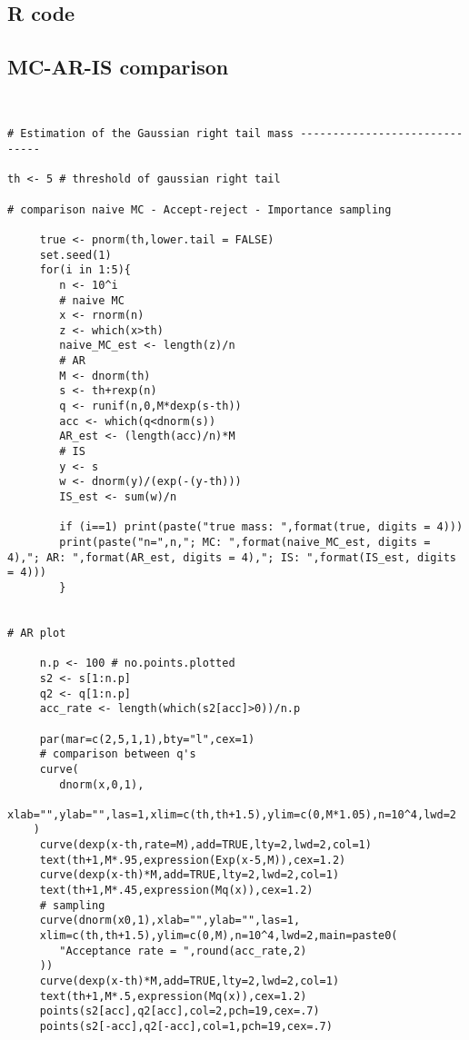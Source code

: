 \begin{appendices}
\chapter{R code}
\section{MC-AR-IS comparison}
\begin{verbatim}
    

# Estimation of the Gaussian right tail mass ------------------------------

th <- 5 # threshold of gaussian right tail

# comparison naive MC - Accept-reject - Importance sampling
     
     true <- pnorm(th,lower.tail = FALSE)
     set.seed(1)
     for(i in 1:5){
     	n <- 10^i
     	# naive MC
     	x <- rnorm(n)
     	z <- which(x>th)
     	naive_MC_est <- length(z)/n
     	# AR
     	M <- dnorm(th)
     	s <- th+rexp(n)
     	q <- runif(n,0,M*dexp(s-th))
     	acc <- which(q<dnorm(s))
     	AR_est <- (length(acc)/n)*M
     	# IS
     	y <- s
     	w <- dnorm(y)/(exp(-(y-th)))
     	IS_est <- sum(w)/n
     	
     	if (i==1) print(paste("true mass: ",format(true, digits = 4)))
     	print(paste("n=",n,"; MC: ",format(naive_MC_est, digits = 4),"; AR: ",format(AR_est, digits = 4),"; IS: ",format(IS_est, digits = 4)))
     	}


# AR plot

     n.p <- 100 # no.points.plotted
     s2 <- s[1:n.p]
     q2 <- q[1:n.p]
     acc_rate <- length(which(s2[acc]>0))/n.p
     
     par(mar=c(2,5,1,1),bty="l",cex=1)
     # comparison between q's
     curve(
        dnorm(x,0,1),
        xlab="",ylab="",las=1,xlim=c(th,th+1.5),ylim=c(0,M*1.05),n=10^4,lwd=2
    )
     curve(dexp(x-th,rate=M),add=TRUE,lty=2,lwd=2,col=1)
     text(th+1,M*.95,expression(Exp(x-5,M)),cex=1.2) 
     curve(dexp(x-th)*M,add=TRUE,lty=2,lwd=2,col=1)
     text(th+1,M*.45,expression(Mq(x)),cex=1.2) 
     # sampling
     curve(dnorm(x0,1),xlab="",ylab="",las=1,
     xlim=c(th,th+1.5),ylim=c(0,M),n=10^4,lwd=2,main=paste0(
        "Acceptance rate = ",round(acc_rate,2)
     ))
     curve(dexp(x-th)*M,add=TRUE,lty=2,lwd=2,col=1)
     text(th+1,M*.5,expression(Mq(x)),cex=1.2) 
     points(s2[acc],q2[acc],col=2,pch=19,cex=.7)
     points(s2[-acc],q2[-acc],col=1,pch=19,cex=.7)


\end{verbatim}
\end{appendices}
